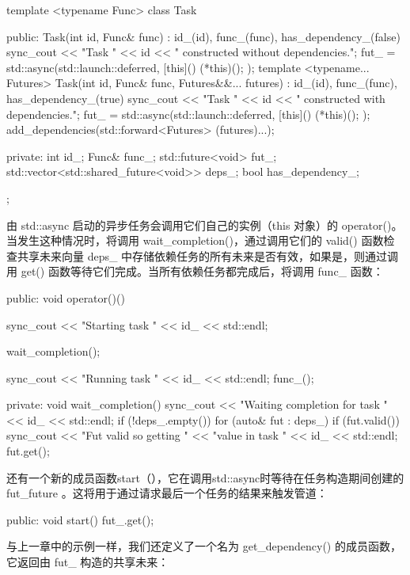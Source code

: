 \begin{cpp}
template <typename Func>
class Task {
    public:
    Task(int id, Func& func)
        : id_(id), func_(func), has_dependency_(false) {
        sync_cout << "Task " << id
                  << " constructed without dependencies.\n";
        fut_ = std::async(std::launch::deferred,
        [this](){ (*this)(); });
    }
    template <typename... Futures>
    Task(int id, Func& func, Futures&&... futures)
        : id_(id), func_(func), has_dependency_(true) {
        sync_cout << "Task " << id
                  << " constructed with dependencies.\n";
        fut_ = std::async(std::launch::deferred,
                          [this](){ (*this)(); });
        add_dependencies(std::forward<Futures>
                                     (futures)...);
    }

private:
    int id_;
    Func& func_;
    std::future<void> fut_;
    std::vector<std::shared_future<void>> deps_;
    bool has_dependency_;
};
\end{cpp}

由 std::async 启动的异步任务会调用它们自己的实例（this 对象）的 operator()。当发生这种情况时，将调用 wait\_completion()，通过调用它们的 valid() 函数检查共享未来向量 deps\_ 中存储依赖任务的所有未来是否有效，如果是，则通过调用 get() 函数等待它们完成。当所有依赖任务都完成后，将调用 func\_ 函数：

\begin{cpp}
public:
void operator()() {
    sync_cout << "Starting task " << id_ << std::endl;

    wait_completion();

    sync_cout << "Running task " << id_ << std::endl;
    func_();
}
private:
void wait_completion() {
    sync_cout << "Waiting completion for task "
              << id_ << std::endl;
    if (!deps_.empty()) {
        for (auto& fut : deps_) {
            if (fut.valid()) {
                sync_cout << "Fut valid so getting "
                          << "value in task " << id_
                          << std::endl;
                fut.get();
            }
        }
    }
}
\end{cpp}

还有一个新的成员函数start（），它在调用std::async时等待在任务构造期间创建的fut\_future 。这将用于通过请求最后一个任务的结果来触发管道：

\begin{cpp}
public:
void start() {
    fut_.get();
}
\end{cpp}

与上一章中的示例一样，我们还定义了一个名为 get\_dependency() 的成员函数，它返回由 fut\_ 构造的共享未来：

